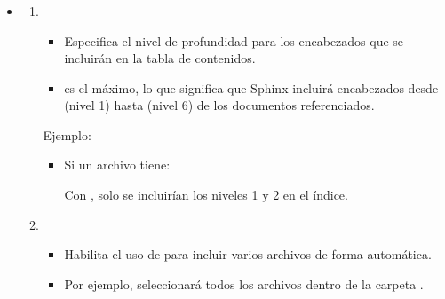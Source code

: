 \documentclass[a4paper,10pt,oneside,spanish,openany]{sphinxmanual}
\begin{document}
\begin{itemize}
\begin{itemize}
\begin{itemize}
\item {} \subsubsection*{}
\begin{enumerate}
%
\item {} 
\sphinxAtStartPar
{}
\begin{itemize}
\item {} 
\sphinxAtStartPar
Especifica el nivel de profundidad para los encabezados que se incluirán en la tabla de contenidos.

\item {} 
\sphinxAtStartPar
{} es el máximo, lo que significa que Sphinx incluirá encabezados desde \sphinxcode{\sphinxupquote{\#}} (nivel 1) hasta \sphinxcode{\sphinxupquote{\#\#\#\#\#\#}} (nivel 6) de los documentos referenciados.

\end{itemize}

\sphinxAtStartPar
Ejemplo:
\begin{itemize}
\item {} 
\sphinxAtStartPar
Si un archivo tiene:

\begin{sphinxVerbatim}[commandchars=\\\{\}]
\end{sphinxVerbatim}

\sphinxAtStartPar
Con , solo se incluirían los niveles 1 y 2 en el índice.

\end{itemize}

\item {} 
\sphinxAtStartPar
{}
\begin{itemize}
\item {} 
\sphinxAtStartPar
Habilita el uso de  para incluir varios archivos de forma automática.

\item {} 
\sphinxAtStartPar
Por ejemplo,  seleccionará todos los archivos dentro de la carpeta .


\end{itemize}
\end{enumerate}
\end{itemize}
\end{itemize}
\end{itemize}
\end{document}
